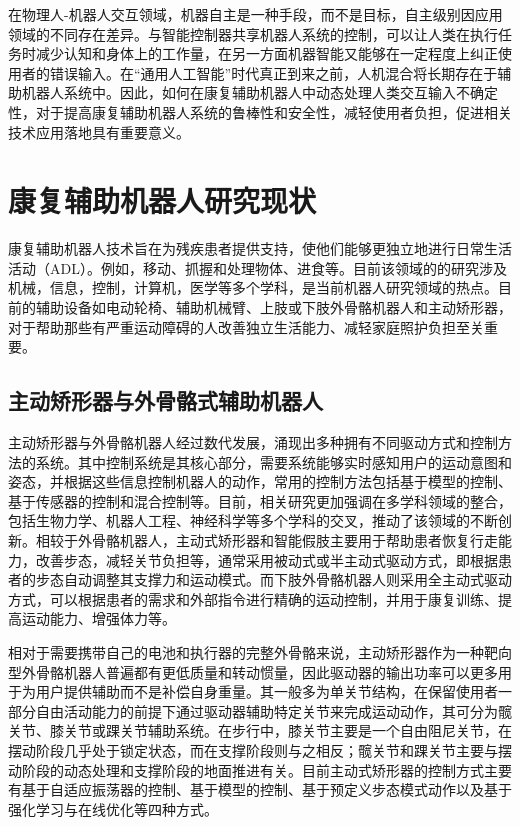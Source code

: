 在物理人-机器人交互领域，机器自主是一种手段，而不是目标，自主级别因应用领域的不同存在差异。与智能控制器共享机器人系统的控制，可以让人类在执行任务时减少认知和身体上的工作量，在另一方面机器智能又能够在一定程度上纠正使用者的错误输入。在``通用人工智能''时代真正到来之前，人机混合将长期存在于辅助机器人系统中\cite{ZhangMianXiangRenJiXuGuanJueCeDeHunHeZhiNengFangFaYanJiu2021}。因此，如何在康复辅助机器人中动态处理人类交互输入不确定性，对于提高康复辅助机器人系统的鲁棒性和安全性，减轻使用者负担，促进相关技术应用落地具有重要意义。

\section{康复辅助机器人研究现状}
康复辅助机器人技术旨在为残疾患者提供支持，使他们能够更独立地进行日常生活活动（ADL）。例如，移动、抓握和处理物体、进食等。目前该领域的的研究涉及机械，信息，控制，计算机，医学等多个学科，是当前机器人研究领域的热点。目前的辅助设备如电动轮椅、辅助机械臂、上肢或下肢外骨骼机器人和主动矫形器，对于帮助那些有严重运动障碍的人改善独立生活能力、减轻家庭照护负担至关重要。
\subsection{主动矫形器与外骨骼式辅助机器人}
主动矫形器与外骨骼机器人经过数代发展，涌现出多种拥有不同驱动方式和控制方法的系统。其中控制系统是其核心部分，需要系统能够实时感知用户的运动意图和姿态，并根据这些信息控制机器人的动作，常用的控制方法包括基于模型的控制、基于传感器的控制和混合控制等。目前，相关研究更加强调在多学科领域的整合，包括生物力学、机器人工程、神经科学等多个学科的交叉，推动了该领域的不断创新。相较于外骨骼机器人，主动式矫形器和智能假肢主要用于帮助患者恢复行走能力，改善步态，减轻关节负担等，通常采用被动式或半主动式驱动方式，即根据患者的步态自动调整其支撑力和运动模式。而下肢外骨骼机器人则采用全主动式驱动方式，可以根据患者的需求和外部指令进行精确的运动控制，并用于康复训练、提高运动能力、增强体力等。

相对于需要携带自己的电池和执行器的完整外骨骼来说，主动矫形器作为一种靶向型外骨骼机器人普遍都有更低质量和转动惯量，因此驱动器的输出功率可以更多用于为用户提供辅助而不是补偿自身重量\cite{collinsReducingEnergyCost2015,zhangHumanintheloopOptimizationExoskeleton2017a}。其一般多为单关节结构，在保留使用者一部分自由活动能力的前提下通过驱动器辅助特定关节来完成运动动作，其可分为髋关节、膝关节或踝关节辅助系统\cite{malcolmExperimentalStudyRole2009}。在步行中，膝关节主要是一个自由阻尼关节，在摆动阶段几乎处于锁定状态，而在支撑阶段则与之相反；髋关节和踝关节主要与摆动阶段的动态处理和支撑阶段的地面推进有关。目前主动式矫形器的控制方式主要有基于自适应振荡器的控制、基于模型的控制、基于预定义步态模式动作以及基于强化学习与在线优化等四种方式\cite{yanReviewAssistiveStrategies2015}。

